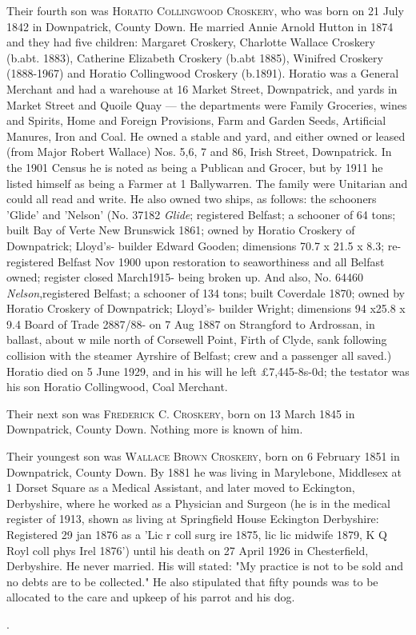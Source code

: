 Their fourth son was \textsc{Horatio Collingwood Croskery}, who was born on	21 July 1842 in Downpatrick, County Down. He married Annie Arnold Hutton in 1874 and they had five children: Margaret Croskery, Charlotte Wallace Croskery (b.abt. 1883), 
Catherine Elizabeth Croskery (b.abt 1885), Winifred Croskery (1888-1967) and Horatio Collingwood Croskery (b.1891).  Horatio was a General Merchant and had a warehouse at 16 Market Street, Downpatrick, and yards in Market Street and Quoile Quay — the departments were Family Groceries, wines and Spirits, Home and Foreign Provisions, Farm and Garden Seeds, Artificial Manures, Iron and Coal. He owned a stable and yard, and either owned or leased (from Major Robert Wallace) Nos. 5,6, 7 and 86, Irish Street, Downpatrick. In the 1901 Census he is noted as being a Publican and Grocer, but by 1911 he listed himself as being a Farmer at 1 Ballywarren. The family were Unitarian and could all read and write. He also owned two ships, as follows:  the schooners 'Glide' and 'Nelson' (No. 37182 \textit{Glide}; registered Belfast; a schooner of 64 tons; built Bay of Verte New Brunswick 1861; owned by Horatio Croskery of Downpatrick; Lloyd’s- builder Edward Gooden; dimensions 70.7 x 21.5 x 8.3; re-registered Belfast Nov 1900 upon restoration to seaworthiness and all Belfast owned; register closed March1915- being broken up. And also, No. 64460 \textit{Nelson},registered Belfast; a schooner of 134 tons; built Coverdale 1870; owned by Horatio Croskery of Downpatrick; Lloyd’s- builder Wright; dimensions 94 x25.8 x 9.4 Board of Trade 2887/88- on 7 Aug 1887 on Strangford to Ardrossan, in ballast, about w mile north of Corsewell Point, Firth of Clyde, sank following collision with the steamer Ayrshire of Belfast; crew and a passenger all saved.)   Horatio died on 5 June 1929, and in his will he left £7,445-8s-0d; the testator was his son Horatio Collingwood, Coal Merchant. 

Their next son was \textsc{Frederick C. Croskery}, born on 13 March 1845 in Downpatrick, County Down. Nothing more is known of him.

Their youngest son was \textsc{Wallace Brown Croskery}, born on 6 February 1851 in Downpatrick, County Down.  By 1881 he was living in Marylebone, Middlesex at 1 Dorset Square as a Medical Assistant, and later moved to Eckington, Derbyshire, where he worked as a Physician and Surgeon  (he is in the medical register of 1913, shown as living at Springfield House Eckington Derbyshire: Registered 29 jan 1876 as a 'Lic r coll surg ire 1875, lic lic midwife 1879, K Q Royl coll phys Irel 1876') until his death on 27 April 1926 in Chesterfield, Derbyshire. He never married.  His will stated: "My practice is not to be sold and no debts are to be collected." He also stipulated that fifty pounds was to be allocated to the care and upkeep of his parrot and his dog.


.
